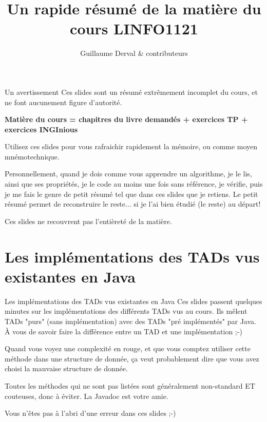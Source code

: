 \documentclass[8pt,aspectratio=169]{beamer}
\begin{document}
	\author{Guillaume Derval \& contributeurs}
	\title{Un rapide résumé de la matière du cours LINFO1121}
	\begin{frame}[plain]
	\maketitle
\end{frame}

\begin{frame}{Un avertissement}
Ces slides sont un résumé extrêmement incomplet du cours, et ne font aucunement figure d'autorité. 

\begin{center}
	\color{red} \textbf{Matière du cours = chapitres du livre demandés + exercices TP + exercices INGInious}
\end{center}

Utilisez ces slides pour vous rafraichir rapidement la mémoire, ou comme moyen mnémotechnique.

Personnellement, quand je dois comme vous apprendre un algorithme, je le lis, ainsi que ses propriétés, je le code au moins une fois sans référence, je vérifie, puis je me fais le genre de petit résumé tel que dans ces slides que je retiens. Le petit résumé permet de reconstruire le reste... si je l'ai bien étudié (le reste) au départ!

\color{red} Ces slides ne recouvrent pas l'entièreté de la matière. 

\end{frame}
\section{Les implémentations des TADs vus existantes en Java}

\begin{frame}{Les implémentations des TADs vus existantes en Java}
Ces slides passent quelques minutes sur les implémentations des différents TADs vus au cours. Ils mêlent TADs "purs" (sans implémentation) avec des TADs "pré implémentés" par Java.
À vous de savoir faire la différence entre un TAD et une implémentation ;-)

Quand vous voyez une complexité en rouge, et que vous comptez utiliser cette méthode dans une structure de donnée, ça veut probablement dire que vous avez choisi la mauvaise structure de donnée.

Toutes les méthodes qui ne sont pas listées sont généralement non-standard ET couteuses, donc à éviter. La Javadoc est votre amie.

Vous n'êtes pas à l'abri d'une erreur dans ces slides ;-)
\end{frame}
\end{document}
